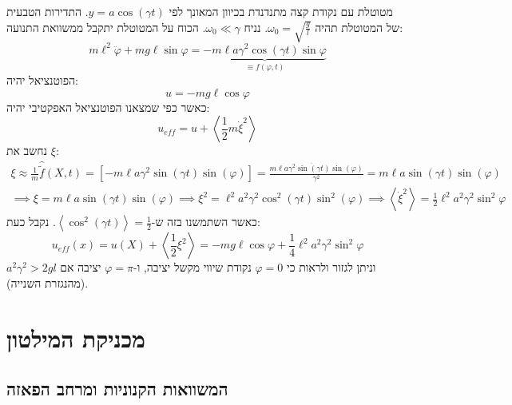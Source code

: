 \documentclass{tstextbook}
\begin{document}
\begin{example}
מטוטלת עם נקודת קצה מתנדנדת בכיוון המאונך לפי \(y=a\cos\left( \gamma t \right)\). 
התדירות הטבעית של המטוטלת תהיה \(\omega_{0}=\sqrt{ \frac{g}{l} }\). נניח \(\omega_{0}\ll \gamma\). הכוח על המטוטלת יתקבל ממשוואת התנועה:
$$m\ell^{2}{\ddot{\varphi}}+m g\ell\sin\varphi=\underbrace{-m\ell a\gamma^{2}\cos\left(\gamma t\right)\sin\varphi}_{\equiv f(\varphi,t)}$$
הפוטנציאל יהיה:
$$u=-mg\ell \cos \varphi$$
כאשר כפי שמצאנו הפוטנציאל האפקטיבי יהיה:
$$u_{eff}=u+\left\langle  \frac{1}{2}m\dot{\xi}^2 \right\rangle $$
נחשב את \(\xi\):
$$\begin{array}{c}{{\xi\approx\displaystyle\frac{1}{m}\hat{\tilde{f}}\left(X,t\right)=\left[-m\ell a\gamma^{2}\sin\left(\gamma t\right)\sin\left(\varphi\right)\right]=\displaystyle\frac{m\ell a\gamma^{2}\ddot{\sin\left(\gamma t\right)}\sin\left(\varphi\right)}{\gamma^{2}}=m\ell a\sin\left(\gamma t\right)\sin\left(\varphi\right)}}\\ {{\implies  \xi=m\ell a\sin\left(\gamma t\right)\sin\left(\varphi\right)}} {{\implies \xi^{2}=\ell^{2}a^{2}\gamma^{2}\cos^{2}\left(\gamma t\right)\sin^{2}\left(\varphi\right)}} {{\implies  \left\langle\dot{\xi}^{2}\right\rangle=\frac{1}{2}\ell^{2}a^{2}\gamma^{2}\sin^{2}\varphi}}\end{array}$$
כאשר השתמשנו בזה ש-\(\left\langle  \cos^2\left( \gamma t \right) \right\rangle=\frac{1}{2}\). נקבל כעת:
$$u_{e f f}\left(x\right)=u\left(X\right)+\left\langle\frac{1}{2}\xi^{2}\right\rangle=-m g\ell\cos\varphi+\frac{1}{4}\ell^{2}a^{2}\gamma^{2}\sin^{2}\varphi$$
וניתן לגזור ולראות כי \(\varphi=0\) נקודת שיווי מקשל יציבה, ו-\(\varphi=\pi\) יציבה אם \(a^2\gamma^2>2gl\)(מהנגזרת השנייה).

\end{example}
\section{מכניקת המילטון}

\subsection{המשוואות הקנוניות ומרחב הפאזה}
\end{document}
